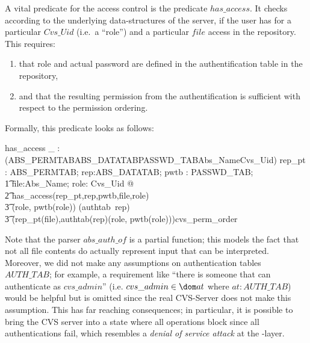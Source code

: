 A vital predicate for the access control is the predicate $has\_access$.  It
checks according to the underlying data-structures of the server, if the user
has for a particular $Cvs\_Uid$ (i.e.\ a ``role'') and a particular $file$ access
in the repository. This requires:
\begin{enumerate}
\item that role and actual password are defined in the authentification
      table in the repository,
\item and that the resulting permission from the authentification
      is sufficient with respect to the permission ordering.
\end{enumerate}
Formally, this predicate looks as follows:
\begin{axdef}
  has\_access \_ :\power(ABS\_PERMTAB\cross ABS\_DATATAB\cross PASSWD\_TAB\cross Abs\_Name\cross Cvs\_Uid)
  \where
  \forall rep\_pt : ABS\_PERMTAB; rep:ABS\_DATATAB; pwtb : PASSWD\_TAB; \\
    \t1 file:Abs\_Name; role: Cvs\_Uid @ \\
    \t2 has\_access(rep\_pt,rep,pwtb,file,role)  \iff \\
    \t3 (role, pwtb(role)) \in \dom(authtab~rep) \\
    \t3 \land (rep\_pt(file),authtab(rep)(role, pwtb(role)))\in cvs\_perm\_order
\end{axdef}


Note that the parser $abs\_auth\_of$ is a partial function; this models the fact
that not all file contents do actually represent input that can be interpreted.
Moreover, we did not make any assumptions on authentication tables $AUTH\_TAB$;
for example, a requirement like ``there is someone that can authenticate as
$cvs\_admin$'' (i.e.  $ cvs\_admin \in \dom at$ where $at : AUTH\_TAB$) would be
helpful but is omitted since the real CVS-Server does not make this assumption.
This has far reaching consequences; in particular, it is possible to bring the
CVS server into a state where all operations block since all authentications
fail, which resembles a \emph{denial of service
  attack} at the \posix-layer.

